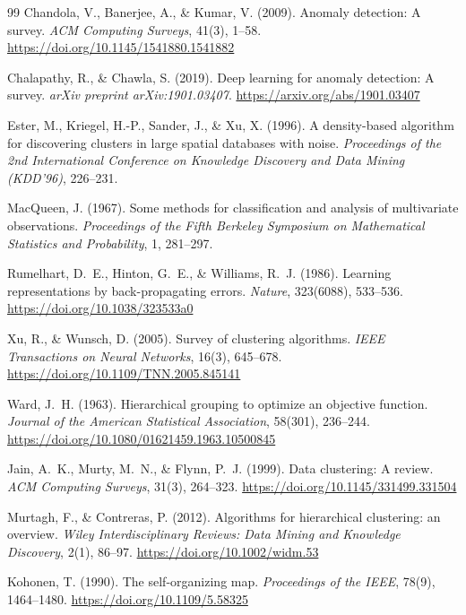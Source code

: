 \documentclass[12pt,a4paper]{article}
\theoremstyle{definition}
\theoremstyle{plain}
\theoremstyle{remark}
\begin{document}
\begin{thebibliography}{99}
Chandola, V., Banerjee, A., \& Kumar, V. (2009).
Anomaly detection: A survey.
\emph{ACM Computing Surveys}, 41(3), 1--58.
\url{https://doi.org/10.1145/1541880.1541882}

Chalapathy, R., \& Chawla, S. (2019).
Deep learning for anomaly detection: A survey.
\emph{arXiv preprint arXiv:1901.03407}.
\url{https://arxiv.org/abs/1901.03407}

Ester, M., Kriegel, H.-P., Sander, J., \& Xu, X. (1996).
A density-based algorithm for discovering clusters in large spatial databases with noise.
\emph{Proceedings of the 2nd International Conference on Knowledge Discovery and Data Mining (KDD'96)}, 226--231.

MacQueen, J. (1967).
Some methods for classification and analysis of multivariate observations.
\emph{Proceedings of the Fifth Berkeley Symposium on Mathematical Statistics and Probability}, 1, 281--297.

Rumelhart, D.~E., Hinton, G.~E., \& Williams, R.~J. (1986).
Learning representations by back-propagating errors.
\emph{Nature}, 323(6088), 533--536.
\url{https://doi.org/10.1038/323533a0}

Xu, R., \& Wunsch, D. (2005).
Survey of clustering algorithms.
\emph{IEEE Transactions on Neural Networks}, 16(3), 645--678.
\url{https://doi.org/10.1109/TNN.2005.845141}


Ward, J.~H. (1963).
Hierarchical grouping to optimize an objective function.
\emph{Journal of the American Statistical Association}, 58(301), 236--244.
\url{https://doi.org/10.1080/01621459.1963.10500845}

Jain, A.~K., Murty, M.~N., \& Flynn, P.~J. (1999).
Data clustering: A review.
\emph{ACM Computing Surveys}, 31(3), 264--323.
\url{https://doi.org/10.1145/331499.331504}

Murtagh, F., \& Contreras, P. (2012).
Algorithms for hierarchical clustering: an overview.
\emph{Wiley Interdisciplinary Reviews: Data Mining and Knowledge Discovery}, 2(1), 86--97.
\url{https://doi.org/10.1002/widm.53}

Kohonen, T. (1990).
The self-organizing map.
\emph{Proceedings of the IEEE}, 78(9), 1464--1480.
\url{https://doi.org/10.1109/5.58325}


\end{thebibliography}
\end{document}
